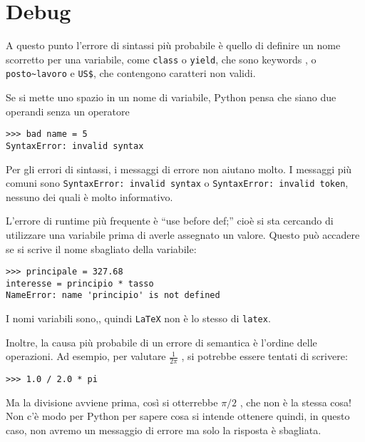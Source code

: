 \section{Debug} 

A questo punto l'errore di sintassi pi\`{u} probabile \`{e} quello di definire un nome scorretto per una variabile, come {\tt class} o {\tt yield}, che sono keywords , o \verb"posto~lavoro" e \verb"US$", che contengono caratteri non validi.

 
 


Se si mette uno spazio in un nome di variabile, Python pensa che siano due operandi senza un operatore

\beforeverb \begin{verbatim}
>>> bad name = 5
SyntaxError: invalid syntax \end{verbatim} \afterverb
%
Per gli errori di sintassi, i messaggi di errore non aiutano molto. I messaggi pi\`{u} comuni sono {\tt SyntaxError: invalid syntax} o {\tt SyntaxError:
invalid token}, nessuno dei quali \`{e} molto informativo.

  
 

L'errore di runtime pi\`{u} frequente \`{e} {``}use before def;'' cio\`{e} si sta cercando di utilizzare una variabile prima di averle assegnato un valore. Questo pu\`{o} accadere se si scrive il nome sbagliato della variabile:

\beforeverb \begin{verbatim}
>>> principale = 327.68 
interesse = principio * tasso
NameError: name 'principio' is not defined \end{verbatim} \afterverb
%
I nomi variabili sono,, quindi {\tt LaTeX} non \`{e} lo stesso di {\tt latex}.

 

Inoltre, la causa pi\`{u} probabile di un errore di semantica \`{e} l'ordine delle operazioni. Ad esempio, per valutare $\frac{1}{2 \pi}$ , si potrebbe essere tentati di scrivere:

\beforeverb \begin{verbatim}
>>> 1.0 / 2.0 * pi
\end{verbatim} \afterverb
%
Ma la divisione avviene prima, cos\`{i} si otterrebbe $\pi / 2$ , che non \`{e} la stessa cosa! Non c'\`{e} modo per Python per sapere cosa si intende ottenere quindi, in questo caso, non avremo un messaggio di errore ma solo la risposta \`{e} sbagliata.

